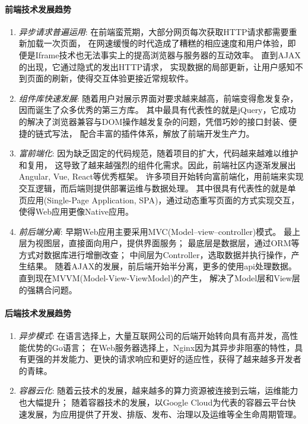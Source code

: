 \documentclass{morningstar}
\begin{document}

\paragraph{前端技术发展趋势}

\begin{enumerate}
\item \emph{异步请求普遍运用}: 在前端蛮荒期，大部分网页每次获取HTTP请求都需要重新加载一次页面，
在网速缓慢的时代造成了糟糕的相应速度和用户体验，即便是Iframe技术也无法事实上的提高浏览器与服务器的互动效率。 
直到AJAX的出现，它通过隐式的发出HTTP请求，
实现数据的局部更新，让用户感知不到页面的刷新，使得交互体验更接近常规软件。\cite{ajax1}

\item \emph{组件库快速发展}: 随着用户对展示界面对要求越来越高，前端变得愈发复杂，因而诞生了众多优秀的第三方库。
其中最具有代表性的就是jQuery，它成功的解决了浏览器兼容与DOM操作越发复杂的问题，凭借巧妙的接口封装、便捷的链式写法，
配合丰富的插件体系，解放了前端开发生产力。\cite{frontend1}

\item \emph{富前端化}: 因为缺乏固定的代码规范，随着项目的扩大，代码越来越难以维护和复用，
这导致了越来越强烈的组件化需求。因此，前端社区内逐渐发展出Angular, Vue, React等优秀框架。
许多项目开始转向富前端化，用前端来实现交互逻辑，而后端则提供部署运维与数据处理。
其中很具有代表性的就是单页应用(Single-Page Application, SPA)，通过动态重写页面的方式实现交互，使得Web应用更像Native应用。 

\item \emph{前后端分离}: 早期Web应用主要采用MVC(Model–view–controller)模式。
最上层为视图层，直接面向用户，提供界面服务；
最底层是数据层，通过ORM等方式对数据库进行增删改查；
中间层为Controller，选取数据并执行操作，产生结果。
随着AJAX的发展，前后端开始半分离，更多的使用api处理数据。
直到现在MVVM(Model-View-ViewModel)的产生，
解决了Model层和View层的强耦合问题。

\end{enumerate}

\paragraph{后端技术发展趋势}
\begin{enumerate}

\item \emph{异步模式}: 在语言选择上，大量互联网公司的后端开始转向具有高并发，高性能优势的Go语言；
在Web服务器选择上，Nginx因为其异步非阻塞的特性，具有更强的并发能力、更快的请求响应和更好的适应性，获得了越来越多开发者的青睐。

\item \emph{容器云化}: 随着云技术的发展，越来越多的算力资源被连接到云端，运维能力也大幅提升；
随着容器技术的发展，以Google Cloud为代表的容器云平台快速发展，为应用提供了开发、排版、发布、治理以及运维等全生命周期管理。

\end{enumerate}
\end{document}
